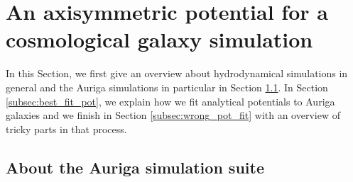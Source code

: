 \section{An axisymmetric potential for a cosmological galaxy simulation}\label{sec:Auriga}
In this Section, we first give an overview about hydrodynamical simulations in general and the Auriga simulations in particular in Section \ref{subsec:auriga}. In Section \ref{subsec:best_fit_pot}, we explain how we fit analytical potentials to Auriga galaxies and we finish in Section \ref{subsec:wrong_pot_fit} with an overview of tricky parts in that process.

\subsection{About the Auriga simulation suite}\label{subsec:auriga}
